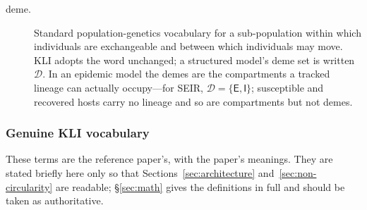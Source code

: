 \documentclass[11pt,leqno]{article}
\newcommand{\Demes}{\mathcal{D}}    %
\newcommand{\deme}[1]{\mathsf{#1}}
\theoremstyle{plain}
\theoremstyle{definition}
\begin{document}
\begin{description}
\item[deme.]  Standard population-genetics vocabulary for a
  sub-population within which individuals are exchangeable and between which
  individuals may move.  KLI adopts the word unchanged; a structured model's
  deme set is written~$\Demes$.  In an epidemic model the demes are the
  compartments a tracked lineage can actually occupy---for SEIR,
  $\Demes = \{\deme{E}, \deme{I}\}$; susceptible and recovered hosts carry
  no lineage and so are compartments but not demes.

\end{description}

\subsubsection{Genuine KLI vocabulary}

These terms are the reference paper's, with the paper's meanings.  They are
stated briefly here only so that Sections~\ref{sec:architecture}
and~\ref{sec:non-circularity} are readable; \S\ref{sec:math} gives the
definitions in full and should be taken as authoritative.
\end{document}
